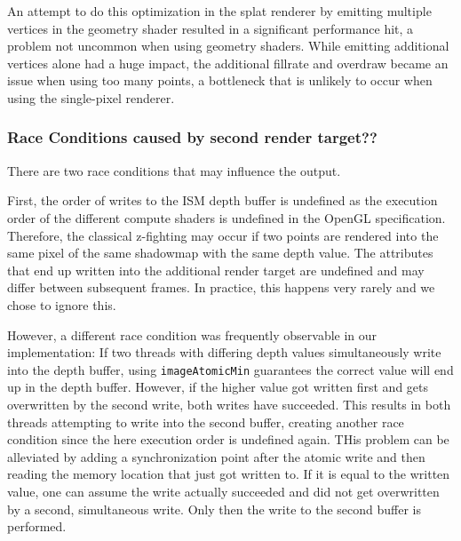 
 An attempt to do this optimization in the splat renderer by emitting multiple vertices in the geometry shader resulted in a significant performance hit, a problem not uncommon when using geometry shaders. While emitting additional vertices alone had a huge impact, the additional fillrate and overdraw became an issue when using too many points, a bottleneck that is unlikely to occur when using the single-pixel renderer.


 \subsubsection{Race Conditions caused by second render target??}

 There are two race conditions that may influence the output.

 First, the order of writes to the ISM depth buffer is undefined as the execution order of the different compute shaders is undefined in the OpenGL specification. Therefore, the classical z-fighting may occur if two points are rendered into the same pixel of the same shadowmap with the same depth value. The attributes that end up written into the additional render target are undefined and may differ between subsequent frames. In practice, this happens very rarely and we chose to ignore this.

 However, a different race condition was frequently observable in our implementation:
 If two threads with differing depth values simultaneously write into the depth buffer, using \texttt{imageAtomicMin} guarantees the correct value will end up in the depth buffer. However, if the higher value got written first and gets overwritten by the second write, both writes have succeeded. This results in both threads attempting to write into the second buffer, creating another race condition since the here execution order is undefined again. THis problem can be alleviated by adding a synchronization point after the atomic write and then reading the memory location that just got written to. If it is equal to the written value, one can assume the write actually succeeded and did not get overwritten by a second, simultaneous write. Only then the write to the second buffer is performed.


